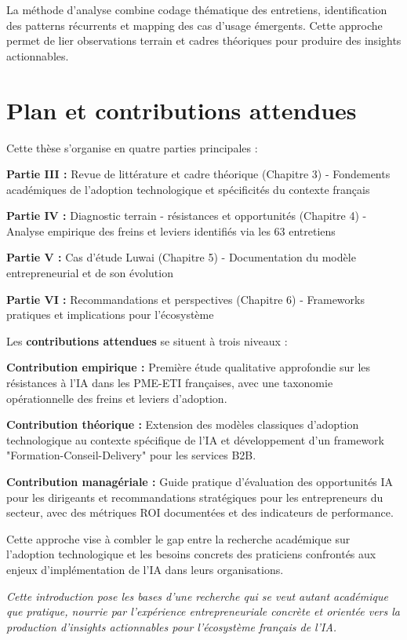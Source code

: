 \documentclass[12pt,a4paper]{report}
\begin{document}
La méthode d'analyse combine codage thématique des entretiens, identification des patterns récurrents et mapping des cas d'usage émergents. Cette approche permet de lier observations terrain et cadres théoriques pour produire des insights actionnables.

\section{Plan et contributions attendues}

Cette thèse s'organise en quatre parties principales :

\textbf{Partie III :} Revue de littérature et cadre théorique (Chapitre 3) - Fondements académiques de l'adoption technologique et spécificités du contexte français

\textbf{Partie IV :} Diagnostic terrain - résistances et opportunités (Chapitre 4) - Analyse empirique des freins et leviers identifiés via les 63 entretiens

\textbf{Partie V :} Cas d'étude Luwai (Chapitre 5) - Documentation du modèle entrepreneurial et de son évolution

\textbf{Partie VI :} Recommandations et perspectives (Chapitre 6) - Frameworks pratiques et implications pour l'écosystème

Les \textbf{contributions attendues} se situent à trois niveaux :

\textbf{Contribution empirique :} Première étude qualitative approfondie sur les résistances à l'IA dans les PME-ETI françaises, avec une taxonomie opérationnelle des freins et leviers d'adoption.

\textbf{Contribution théorique :} Extension des modèles classiques d'adoption technologique au contexte spécifique de l'IA et développement d'un framework "Formation-Conseil-Delivery" pour les services B2B.

\textbf{Contribution managériale :} Guide pratique d'évaluation des opportunités IA pour les dirigeants et recommandations stratégiques pour les entrepreneurs du secteur, avec des métriques ROI documentées et des indicateurs de performance.

Cette approche vise à combler le gap entre la recherche académique sur l'adoption technologique et les besoins concrets des praticiens confrontés aux enjeux d'implémentation de l'IA dans leurs organisations.

\emph{Cette introduction pose les bases d'une recherche qui se veut autant académique que pratique, nourrie par l'expérience entrepreneuriale concrète et orientée vers la production d'insights actionnables pour l'écosystème français de l'IA.}
\end{document}
